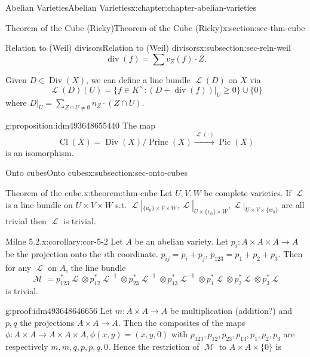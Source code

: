 \documentclass[oneside,10pt,]{book}
\numberwithin{equation}{section}
\newcommand{\sheaf}[1]{\operatorname{\mathcal{#1}}}
\DeclareMathOperator{\divisor}{div}
\DeclareMathOperator{\Div}{Div}
\DeclareMathOperator{\Cl}{Cl}
\DeclareMathOperator{\Pic}{Pic}
\DeclareMathOperator{\Princ}{Princ}
\begin{document}
\begin{chapterptx}{Abelian Varieties}{}{Abelian Varieties}{}{}{x:chapter:chapter-abelian-varieties}
\begin{sectionptx}{Theorem of the Cube (Ricky)}{}{Theorem of the Cube (Ricky)}{}{}{x:section:sec-thm-cube}
\begin{subsectionptx}{Relation to (Weil) divisors}{}{Relation to (Weil) divisors}{}{}{x:subsection:sec-reln-weil}
\begin{equation*}
\divisor (f) = \sum v_Z(f) \cdot Z\text{.}
\end{equation*}
%
\par
Given \(D \in \Div(X)\), we can define a line bundle \(\sheaf L(D)\) on \(X\) via%
\begin{equation*}
\sheaf L(D)(U) = \{f\in K^\times : (D + \divisor (f))|_U\ge 0 \} \cup \{0\}
\end{equation*}
where \(D|_U = \sum_{Z\cap U\ne \emptyset} n_Z\cdot (Z\cap U)\).%
\begin{proposition}{}{}{g:proposition:idm493648655440}%
The map%
\begin{equation*}
\Cl(X) = \Div(X)/\Princ(X) \xrightarrow{\sheaf L(\cdot)} \Pic(X)
\end{equation*}
is an isomorphism.%
\end{proposition}
\end{subsectionptx}
%
%
\typeout{************************************************}
\typeout{************************************************}
%
\begin{subsectionptx}{Onto cubes}{}{Onto cubes}{}{}{x:subsection:sec-onto-cubes}
\begin{theorem}{Theorem of the cube.}{}{x:theorem:thm-cube}%
Let \(U,V,W\) be complete varieties. If \(\sheaf L \) is a line bundle on \(U\times V\times W\) s.t. \(\sheaf L|_{\{u_0\}\times V\times W},\sheaf L|_{U\times \{v_0\}\times W}, \sheaf L|_{U\times V\times \{w_0\}}\) are all trivial then \(\sheaf L\) is trivial.%
\end{theorem}
\begin{corollary}{Milne 5.2.}{}{x:corollary:cor-5-2}%
Let \(A\) be an abelian variety. Let \(p_i\colon A\times A\times A \to A\) be the projection onto the \(i\)th coordinate. \(p_{ij} = p_i+p_j\), \(p_{123} = p_1+p_2+p_3\). Then for any \(\sheaf L\) on \(A\), the line bundle%
\begin{equation*}
\sheaf M  = p_{123}^*\sheaf L \otimes p_{12}^*\sheaf L^{-1}\otimes p_{23}^*\sheaf L^{-1}\otimes p_{13}^*\sheaf L^{-1} \otimes p_1^*\sheaf L \otimes p_2^*\sheaf L \otimes p_3^*\sheaf L
\end{equation*}
is trivial.%
\end{corollary}
\begin{proofptx}{}{g:proof:idm493648646656}
Let  \(m \colon A\times A \to A\) be multiplication (addition?) and \(p,q\) the projections \(A\times A \to A\). Then the composites of the maps \(\phi\colon A\times A \to A \times A \times A, \phi(x,y) = (x,y,0)\) with \(p_{123}, p_{12}, p_{23}, p_{13}, p_1, p_2, p_3\) are respectively \(m,m,q, p, p, q, 0\). Hence the restriction of \(\sheaf M\) to \(A \times A \times \{0\}\) is%

\end{proofptx}
\end{subsectionptx}
\end{sectionptx}
\end{chapterptx}
\end{document}
